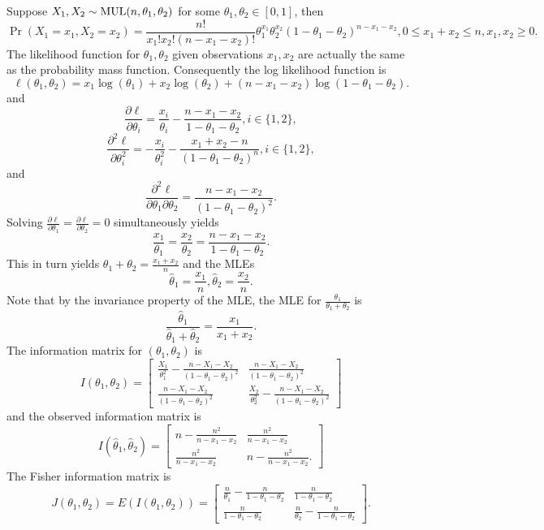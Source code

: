 \documentclass[11pt,fleqn]{book} %
\begin{document}
\begin{example} \label{eg:811}
Suppose \(X_1, X_2 \sim \operatorname{MUL}(n, \theta_1, \theta_2)\) for some \(\theta_1, \theta_2 \in [0, 1]\), then
\[
\Pr(X_1 = x_1, X_2 = x_2) = \frac{n!}{x_1!x_2!(n - x_1 - x_2)!} \theta_1^{x_1}\theta_2^{x_2}(1 - \theta_1 - \theta_2)^{n - x_1 - x_2}, 0 \leq x_1 + x_2 \leq n, x_1, x_2 \geq 0.
\]
\indent The likelihood function for \(\theta_1, \theta_2\) given observations \(x_1, x_2\) are actually the same as the probability mass function. Consequently the log likelihood function is
\[
\ell(\theta_1, \theta_2) = x_1\log(\theta_1) + x_2\log(\theta_2) + (n - x_1 - x_2)\log(1 - \theta_1 - \theta_2).
\]
and
\[
\frac{\partial\ell}{\partial\theta_i} = \frac{x_i}{\theta_i} - \frac{n - x_1 - x_2}{1 - \theta_1 - \theta_2}, i \in \{1, 2\},
\]
\[
\frac{\partial^2\ell}{\partial\theta_i^2} = -\frac{x_i}{\theta_i^2} - \frac{x_1 + x_2 - n}{(1 - \theta_1 - \theta_2)^n}, i \in \{1, 2\},
\]
and
\[
\frac{\partial^2\ell}{\partial\theta_1\partial\theta_2} = \frac{n - x_1 - x_2}{(1 - \theta_1 - \theta_2)^2}.
\]
\indent Solving \(\frac{\partial\ell}{\partial\theta_1} = \frac{\partial\ell}{\partial\theta_2} = 0\) simultaneously yields
\[
\frac{x_1}{\theta_1} = \frac{x_2}{\theta_2} = \frac{n - x_1 - x_2}{1 - \theta_1 - \theta_2}.
\]
\indent This in turn yields \(\theta_1 + \theta_2 = \frac{x_1 + x_2}{n}\) and the MLEs
\[
\hat{\theta}_1 = \frac{x_1}{n}, \hat{\theta}_2 = \frac{x_2}{n}.
\]
\indent Note that by the invariance property of the MLE, the MLE for \(\frac{\theta_1}{\theta_1 + \theta_2}\) is
\[
\frac{\hat{\theta}_1}{\hat{\theta}_1 + \hat{\theta}_2} = \frac{x_1}{x_1 + x_2}.
\]
\indent The information matrix for \((\theta_1, \theta_2)\) is
\[
I(\theta_1, \theta_2) = \begin{bmatrix}
\frac{X_1}{\theta_1^2} - \frac{n - X_1 - X_2}{(1 - \theta_1 - \theta_2)^2} & \frac{n - X_1 - X_2}{(1 - \theta_1 - \theta_2)^2} \\
\frac{n - X_1 - X_2}{(1 - \theta_1 - \theta_2)^2} & \frac{X_2}{\theta_2^2} - \frac{n - X_1 - X_2}{(1 - \theta_1 - \theta_2)^2}
\end{bmatrix}
\]
and the observed information matrix is
\[
I(\hat{\theta}_1, \hat{\theta}_2) = \begin{bmatrix}
n - \frac{n^2}{n - x_1 - x_2} & \frac{n^2}{n - x_1 - x_2} \\
\frac{n^2}{n - x_1 - x_2} & n - \frac{n^2}{n - x_1 - x_2}.
\end{bmatrix}
\]
\indent The Fisher information matrix is
\[
J(\theta_1, \theta_2) = E(I(\theta_1, \theta_2)) = \begin{bmatrix}
\frac{n}{\theta_1} - \frac{n}{1 - \theta_1 - \theta_2} & \frac{n}{1 - \theta_1 - \theta_2} \\
\frac{n}{1 - \theta_1 - \theta_2} & \frac{n}{\theta_2} - \frac{n}{1 - \theta_1 - \theta_2}
\end{bmatrix}.
\]
\end{example}
\end{document}
